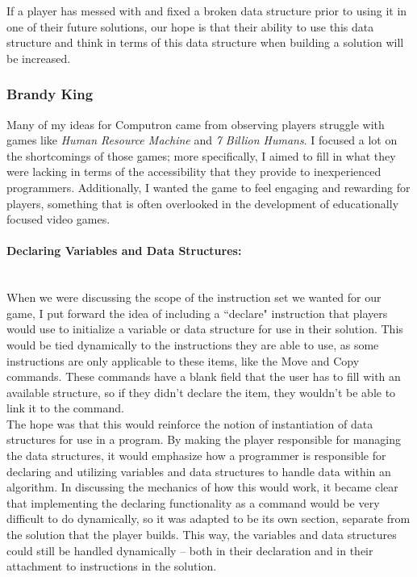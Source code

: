 If a player has messed with and fixed a broken data structure prior to using it in one of
their future solutions, our hope is that their ability to use this data structure and think in
terms of this data structure when building a solution will be increased.\\

\subsubsection{Brandy King}
Many of my ideas for Computron came from observing players struggle with games like \textit{Human
Resource Machine} and \textit{7 Billion Humans}. I focused a lot on the shortcomings of those games; 
more specifically, I aimed to fill in what they were lacking in terms of the accessibility that they provide 
to inexperienced programmers. Additionally, I wanted the game to feel engaging and rewarding for 
players, something that is often overlooked in the development of educationally focused video games. \\

\paragraph{Declaring Variables and Data Structures:} ~\\
When we were discussing the scope of the instruction set we wanted for our game, I put forward the idea
of including a ``declare" instruction that players would use to initialize a variable or data structure for use
in their solution. This would be tied dynamically to the instructions they are able to use, as some instructions
are only applicable to these items, like the Move and Copy commands. These commands have a blank field
that the user has to fill with an available structure, so if they didn't declare the item, they wouldn't be able to
link it to the command.\\

The hope was that this would reinforce the notion of instantiation of data structures for use in a program. By
making the player responsible for managing the data structures, it would emphasize how a programmer
is responsible for declaring and utilizing variables and data structures to handle data within an algorithm. In
discussing the mechanics of how this would work, it became clear that implementing the declaring functionality
as a command would be very difficult to do dynamically, so it was adapted to be its own section, separate from
the solution that the player builds. This way, the variables and data structures could still be handled dynamically --
both in their declaration and in their attachment to instructions in the solution.\\

